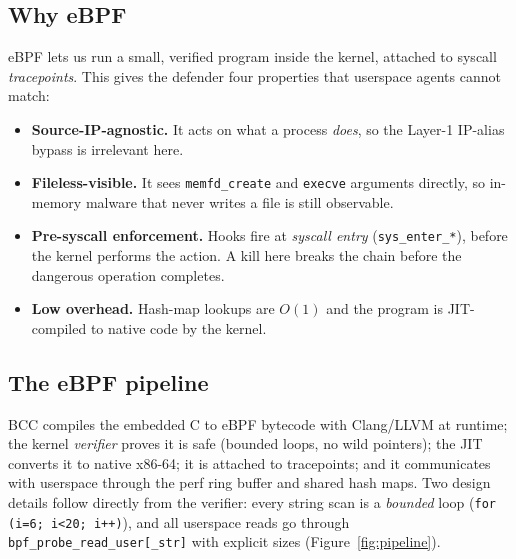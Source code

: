 \documentclass[11pt]{article}
\newcommand{\co}[1]{\texttt{#1}}
\begin{document}
\subsection{Why eBPF}
eBPF lets us run a small, verified program inside the kernel, attached to
syscall \emph{tracepoints}. This gives the defender four properties that
userspace agents cannot match:
\begin{itemize}[leftmargin=1.4em]
  \item \textbf{Source-IP-agnostic.} It acts on what a process \emph{does},
        so the Layer-1 IP-alias bypass is irrelevant here.
  \item \textbf{Fileless-visible.} It sees \co{memfd\_create} and
        \co{execve} arguments directly, so in-memory malware that never
        writes a file is still observable.
  \item \textbf{Pre-syscall enforcement.} Hooks fire at \emph{syscall entry}
        (\co{sys\_enter\_*}), before the kernel performs the action. A kill
        here breaks the chain before the dangerous operation completes.
  \item \textbf{Low overhead.} Hash-map lookups are $O(1)$ and the program
        is JIT-compiled to native code by the kernel.
\end{itemize}

\subsection{The eBPF pipeline}
BCC compiles the embedded C to eBPF bytecode with Clang/LLVM at runtime; the
kernel \emph{verifier} proves it is safe (bounded loops, no wild pointers);
the JIT converts it to native x86-64; it is attached to tracepoints; and it
communicates with userspace through the perf ring buffer and shared hash
maps. Two design details follow directly from the verifier: every string
scan is a \emph{bounded} loop (\co{for (i=6; i<20; i++)}), and all userspace
reads go through \co{bpf\_probe\_read\_user[\_str]} with explicit sizes
(Figure~\ref{fig:pipeline}).
\end{document}
